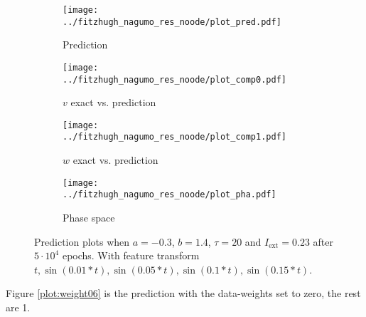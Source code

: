 \documentclass[a4paper]{article}
\begin{document}
\begin{figure}[H]
	\centering 
	\begin{subfigure}[b]{0.47\textwidth}
		\centering
		\texttt{[image: ../fitzhugh\_nagumo\_res\_noode/plot\_pred.pdf]}
		\caption{Prediction}
		\label{fig:weight05a}
	\end{subfigure}
	\begin{subfigure}[b]{0.47\textwidth}
		\centering
		\texttt{[image: ../fitzhugh\_nagumo\_res\_noode/plot\_comp0.pdf]}
		\caption{$v$ exact vs. prediction}
		\label{fig:weight05b}
	\end{subfigure}
	\begin{subfigure}[b]{0.47\textwidth}
		\centering
		\texttt{[image: ../fitzhugh\_nagumo\_res\_noode/plot\_comp1.pdf]}
		\caption{$w$ exact vs. prediction}
		\label{fig:weight05c}
	\end{subfigure}
	\begin{subfigure}[b]{0.47\textwidth}
		\centering
		\texttt{[image: ../fitzhugh\_nagumo\_res\_noode/plot\_pha.pdf]}
		\caption{Phase space}
		\label{fig:weight05d}
	\end{subfigure}
	\caption{Prediction plots when $a=-0.3$, $b=1.4$, $\tau=20$ and $ I_{\text{ext}}=0.23$ after $5\cdot10^4$ epochs. With feature transform $t, \sin(0.01 * t), \sin(0.05 * t), \sin(0.1 * t), \sin(0.15 * t)$.}
	\label{plot:weight05}
\end{figure} 	

Figure \ref{plot:weight06} is the prediction with the data-weights set to zero, the rest are 1.
\end{document}
